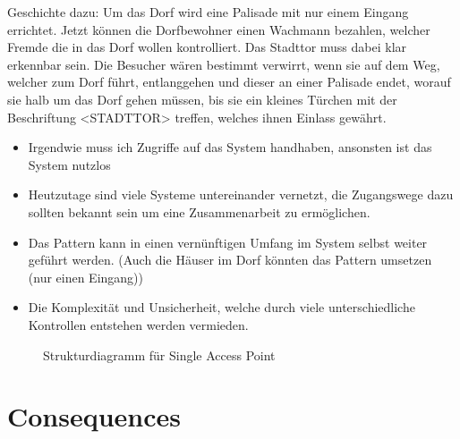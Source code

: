 Geschichte dazu: Um das Dorf wird eine Palisade mit nur einem Eingang errichtet. Jetzt können die Dorfbewohner einen Wachmann bezahlen, welcher Fremde die in das Dorf wollen kontrolliert. Das Stadttor muss dabei klar erkennbar sein. Die Besucher wären bestimmt verwirrt, wenn sie auf dem Weg, welcher zum Dorf führt, entlanggehen und dieser an einer Palisade endet, worauf sie halb um das Dorf gehen müssen, bis sie ein kleines Türchen mit der Beschriftung <STADTTOR> treffen, welches ihnen Einlass gewährt.

\begin{itemize}
  \item Irgendwie muss ich Zugriffe auf das System handhaben, ansonsten ist das System nutzlos
  \item Heutzutage sind viele Systeme untereinander vernetzt, die Zugangswege dazu sollten bekannt sein um eine Zusammenarbeit zu ermöglichen.
  \item Das Pattern kann in einen vernünftigen Umfang im System selbst weiter geführt werden. (Auch die Häuser im Dorf könnten das Pattern umsetzen (nur einen Eingang))
  \item Die Komplexität und Unsicherheit, welche durch viele unterschiedliche Kontrollen entstehen werden vermieden.
\end{itemize}

\begin{figure}[H]
  \centering
  
  \caption{Strukturdiagramm f\"ur Single Access Point}
\end{figure}

\section{Consequences}
\begin{itemize}
\end{itemize}

